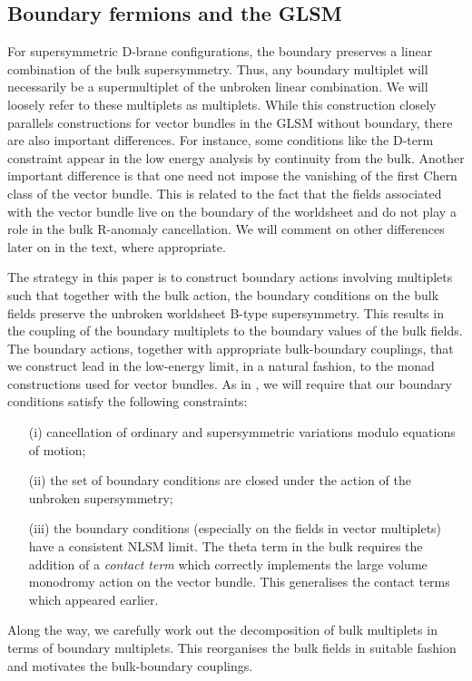 \documentclass[a4paper,12pt]{article}
\begin{document}
\subsection{Boundary fermions and the GLSM}

For supersymmetric D-brane configurations, the boundary preserves
a linear combination of the bulk \coordHE{} supersymmetry. Thus, any
boundary multiplet will necessarily be a supermultiplet of the
unbroken linear combination. We will loosely refer to these multiplets as
 \coordHE{} multiplets. While this construction closely parallels
\coordHE{} constructions for vector bundles in the
GLSM without boundary\cite{zerotwo}, there are also important
differences. For instance, some conditions like the D-term constraint
appear in the low energy analysis by continuity from the bulk. Another
important difference is that one need not impose the vanishing
of the first Chern class of the vector bundle. This is related to the
fact that the fields associated with the vector bundle live on the
boundary of the worldsheet and do not play a role in the bulk R-anomaly
cancellation.  We will
comment on other differences later on in the text, where appropriate.

The strategy in this paper is to construct boundary actions involving
\coordHE{} multiplets such that together with the bulk action, the 
boundary conditions on the bulk fields preserve the unbroken worldsheet
B-type supersymmetry. This results in the coupling of the boundary multiplets
to the boundary values of the bulk fields. The boundary actions, together
with appropriate bulk-boundary couplings, that we
construct lead in the low-energy limit, in a natural fashion,
to the monad constructions used
for vector bundles. As in \cite{lsmone}, we will
require that our boundary conditions satisfy the following constraints:
\begin{enumerate}
\item[(i)] cancellation of ordinary and supersymmetric variations 
modulo equations of motion; 
\item[(ii)] the set of boundary conditions are closed under the
action of the unbroken supersymmetry; 
\item[(iii)] the boundary conditions 
(especially on the fields in vector multiplets) have
a consistent NLSM limit. The theta term in the bulk requires the
addition of a {\em contact term} which correctly implements the large
volume monodromy action on the vector bundle. This generalises the
contact terms which appeared earlier\cite{lsmone,HIV}. 
\end{enumerate}
Along the way, we
carefully work out the decomposition of bulk multiplets in terms of
boundary \coordHE{} multiplets. This reorganises the bulk fields
in suitable fashion and motivates the bulk-boundary couplings.
\end{document}
